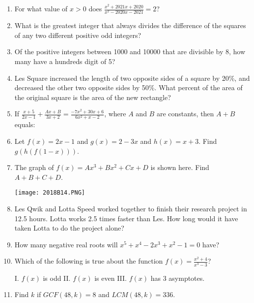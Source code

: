 \documentclass[../uilmath.tex]{subfiles}
\begin{document}
\begin{enumerate}[label=\bfseries\arabic*.]
        \item %
        For what value of $x>0$ does $\frac{x^2+2021x+2020}{x^2-2020x-2021}=2$?

        \item %
        What is the greatest integer that always divides the difference of the squares of any two different positive odd integers?

        \item %
        Of the positive integers between 1000 and 10000 that are divisible by 8, how many have a hundreds digit of 5?

        \item %
        Les Square increased the length of two opposite sides of a square by 20\%, and decreased the other two opposite sides by 50\%. What percent of the area of the original square is the area of the new rectangle?

        \item %
        If $\frac{x+5}{2x-1}+\frac{Ax+B}{3x+2}=\frac{-7x^2+30x+6}{6x^2+x-2}$, where $A$ and $B$ are constants, then $A+B$ equals:

        \item %
        Let $f(x)=2x-1$ and $g(x)=2-3x$ and $h(x)=x+3$. Find $g(h(f(1-x)))$.

        \item %
        The graph of $f(x)=Ax^3+Bx^2+Cx+D$ is shown here. Find $A+B+C+D$.
        \begin{center}
            \texttt{[image: 2018B14.PNG]}
        \end{center}

        \item %
        Les Qwik and Lotta Speed worked together to finish their research project in 12.5 hours. Lotta works 
        2.5 times faster than Les. How long would it have taken Lotta to do the project alone?

        \item %
        How many negative real roots will $x^5+x^4-2x^3+x^2-1=0$ have?

        \item %
        Which of the following is true about the function $f(x)=\frac{x^2+4}{x^3-3}$?

        I. $f(x)$ is odd \qquad II. $f(x)$ is even \qquad III. $f(x)$ has 3 asymptotes.

        \item %
        Find $k$ if $GCF(48,k)=8$ and $LCM(48,k)=336$.


\end{enumerate}
\end{document}
